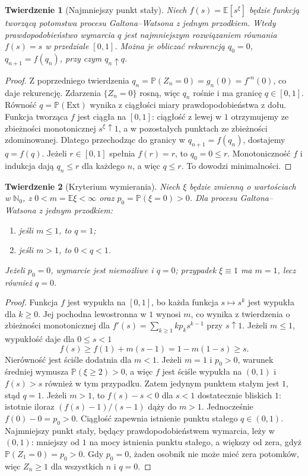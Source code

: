 \documentclass[11pt,a4paper,oneside]{report}
\numberwithin{equation}{chapter}
\theoremstyle{plain}
\newtheorem{twierdzenie}{Twierdzenie}[chapter]
\theoremstyle{definition}
\theoremstyle{remark}
\newcommand{\N}{\mathbb{N}}
\newcommand{\Prob}{\mathbb{P}}
\newcommand{\E}{\mathbb{E}}
\begin{document}
\begin{twierdzenie}[Najmniejszy punkt stały]
Niech $f(s)=\E[s^\xi]$ będzie funkcją tworzącą potomstwa
procesu Galtona--Watsona z jednym przodkiem.
Wtedy prawdopodobieństwo wymarcia $q$ jest
\emph{najmniejszym} rozwiązaniem równania $f(s)=s$
w przedziale $[0,1]$. Można je obliczać rekurencją
$q_0=0$, $q_{n+1}=f(q_n)$, przy czym
$q_n\uparrow q$.
\end{twierdzenie}
\begin{proof}
Z poprzedniego twierdzenia
$q_n=\Prob(Z_n=0)=g_n(0)=f^{\circ n}(0)$,
co daje rekurencję. Zdarzenia $\{Z_n=0\}$ rosną,
więc $q_n$ rośnie i ma granicę $q\in[0,1]$.
Równość $q=\Prob(\mathrm{Ext})$ wynika z ciągłości miary
prawdopodobieństwa z dołu.
Funkcja tworząca $f$ jest ciągła na $[0,1]$:
ciągłość z lewej w $1$ otrzymujemy ze zbieżności monotonicznej
$s^\xi\uparrow1$, a w pozostałych punktach ze zbieżności
zdominowanej. Dlatego przechodząc do granicy w
$q_{n+1}=f(q_n)$, dostajemy $q=f(q)$.
Jeżeli $r\in[0,1]$ spełnia $f(r)=r$, to $q_0=0\le r$.
Monotoniczność $f$ i indukcja dają $q_n\le r$
dla każdego $n$, a więc $q\le r$. To dowodzi minimalności.
\end{proof}

\begin{twierdzenie}[Kryterium wymierania]
Niech $\xi$ będzie zmienną o wartościach w $\N_0$, z
$0<m=\E\xi<\infty$ oraz $p_0=\Prob(\xi=0)>0$.
Dla procesu Galtona--Watsona z jednym przodkiem:
\begin{enumerate}
\item jeśli $m\le1$, to $q=1$;
\item jeśli $m>1$, to $0<q<1$.
\end{enumerate}
Jeżeli $p_0=0$, wymarcie jest niemożliwe i $q=0$;
przypadek $\xi\equiv1$ ma $m=1$, lecz również $q=0$.
\end{twierdzenie}
\begin{proof}
Funkcja $f$ jest wypukła na $[0,1]$, bo każda
funkcja $s\mapsto s^k$ jest wypukła dla $k\ge0$.
Jej pochodna lewostronna w $1$ wynosi $m$, co wynika
z twierdzenia o zbieżności monotonicznej dla
$f'(s)=\sum_{k\ge1}kp_ks^{k-1}$ przy $s\uparrow1$.
Jeżeli $m\le1$, wypukłość daje dla $0\le s<1$
\[
f(s)\ge f(1)+m(s-1)=1-m(1-s)\ge s.
\]
Nierówność jest ściśle dodatnia dla $m<1$.
Jeżeli $m=1$ i $p_0>0$, warunek średniej wymusza
$\Prob(\xi\ge2)>0$, a więc $f$ jest ściśle wypukła
na $(0,1)$ i $f(s)>s$ również w tym przypadku.
Zatem jedynym punktem stałym jest $1$, stąd $q=1$.
Jeżeli $m>1$, to
$f(s)-s<0$ dla $s<1$ dostatecznie bliskich $1$:
istotnie iloraz $(f(s)-1)/(s-1)$ dąży do $m>1$.
Jednocześnie $f(0)-0=p_0>0$.
Ciągłość zapewnia istnienie punktu stałego $q\in(0,1)$.
Najmniejszy punkt stały, będący prawdopodobieństwem wymarcia,
leży w $(0,1)$: mniejszy od $1$ na mocy istnienia punktu stałego,
a większy od zera, gdyż $\Prob(Z_1=0)=p_0>0$.
Gdy $p_0=0$, żaden osobnik nie może mieć zera potomków,
więc $Z_n\ge1$ dla wszystkich $n$ i $q=0$.
\end{proof}
\end{document}
